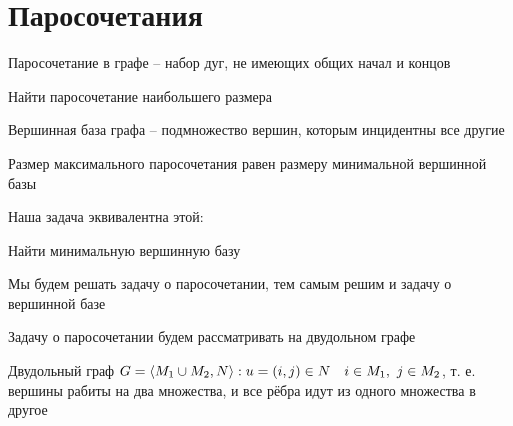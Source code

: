 \section{Паросочетания}

\begin{definition}
	Паросочетание в графе -- набор дуг, не имеющих общих начал и концов
\end{definition}

\begin{problem}
	Найти паросочетание наибольшего размера
\end{problem}

\begin{definition}
    Вершинная база графа -- подмножество вершин, которым инцидентны все другие
\end{definition}

\begin{statement}
    Размер максимального паросочетания равен размеру минимальной вершинной базы
\end{statement}

Наша задача эквивалентна этой:

\begin{problem}
	Найти минимальную вершинную базу
\end{problem}

Мы будем решать задачу о паросочетании, тем самым решим и задачу о вершинной базе

Задачу о паросочетании будем рассматривать на двудольном графе

\begin{definition}
    Двудольный граф $ G = \braket{M_1 \cup M_2, N} : u = (i, j) \in N \quad i \in M_1, ~ j \in M_2 $, т. е. вершины рабиты на два множества, и все рёбра идут из одного множества в другое
\end{definition}

